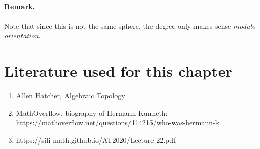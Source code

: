 \paragraph{Remark.} Note that since this is not the same sphere, the degree only makes sense \emph{modulo orientation}.

\section{Literature used for this chapter}

\begin{enumerate}
    \item Allen Hatcher, Algebraic Topology
    \item MathOverflow, biography of Hermann Kunneth: https://mathoverflow.net/questions/114215/who-was-hermann-k%
    \item https://sili-math.github.io/AT2020/Lecture-22.pdf
\end{enumerate}
